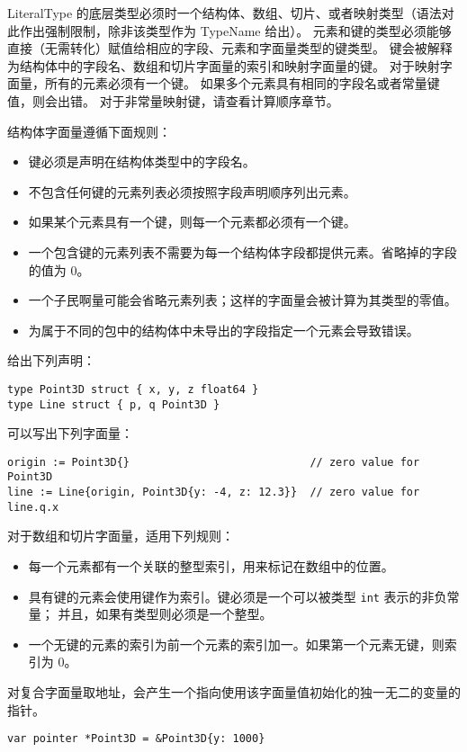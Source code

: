 LiteralType 的底层类型必须时一个结构体、数组、切片、或者映射类型（语法对此作出强制限制，除非该类型作为 TypeName 给出）。
元素和键的类型必须能够直接（无需转化）赋值给相应的字段、元素和字面量类型的键类型。
键会被解释为结构体中的字段名、数组和切片字面量的索引和映射字面量的键。
对于映射字面量，所有的元素必须有一个键。
如果多个元素具有相同的字段名或者常量键值，则会出错。
对于非常量映射键，请查看计算顺序章节。

结构体字面量遵循下面规则：
\begin{itemize}
\item 键必须是声明在结构体类型中的字段名。
\item 不包含任何键的元素列表必须按照字段声明顺序列出元素。
\item 如果某个元素具有一个键，则每一个元素都必须有一个键。
\item 一个包含键的元素列表不需要为每一个结构体字段都提供元素。省略掉的字段的值为 0。
\item 一个子民啊量可能会省略元素列表；这样的字面量会被计算为其类型的零值。
\item 为属于不同的包中的结构体中未导出的字段指定一个元素会导致错误。
\end{itemize}

给出下列声明：
\begin{lstlisting}[style=golang]
type Point3D struct { x, y, z float64 }
type Line struct { p, q Point3D }
\end{lstlisting}
可以写出下列字面量：
\begin{lstlisting}[style=golang]
origin := Point3D{}                            // zero value for Point3D
line := Line{origin, Point3D{y: -4, z: 12.3}}  // zero value for line.q.x
\end{lstlisting}

对于数组和切片字面量，适用下列规则：
\begin{itemize}
\item 每一个元素都有一个关联的整型索引，用来标记在数组中的位置。
\item 具有键的元素会使用键作为索引。键必须是一个可以被类型 \lstinline|int| 表示的非负常量；
并且，如果有类型则必须是一个整型。
\item 一个无键的元素的索引为前一个元素的索引加一。如果第一个元素无键，则索引为 0。
\end{itemize}

对复合字面量取地址，会产生一个指向使用该字面量值初始化的独一无二的变量的指针。
\begin{lstlisting}[style=golang]
var pointer *Point3D = &Point3D{y: 1000}
\end{lstlisting}

